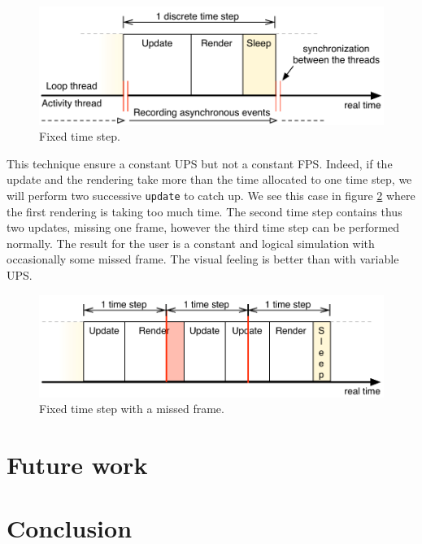 \documentclass[11pt,a4paper]{article}
\begin{document}
\begin{figure}[h]
\centering
\includegraphics[scale = 0.8]{images/fixedTimeStep} 
\caption{Fixed time step.}
\label{fig:fixedTimeStep}
\end{figure}


This technique ensure a constant UPS but not a constant FPS. Indeed, if the update and the rendering take more than the time allocated to one time step, we will perform two successive \texttt{update} to catch up. We see this case in figure \ref{fig:missFrame} where the first rendering is taking too much time. The second time step contains thus two updates, missing one frame, however the third time step can be performed normally. The result for the user is a constant and logical simulation with occasionally some missed frame. The visual feeling is better than with variable UPS.


\begin{figure}[h]
\centering
\includegraphics[scale = 0.8]{images/missFrame} 
\caption{Fixed time step with a missed frame.}
\label{fig:missFrame}
\end{figure}

\section{Future work}


\section{Conclusion}


\nocite{*}


\end{document}
